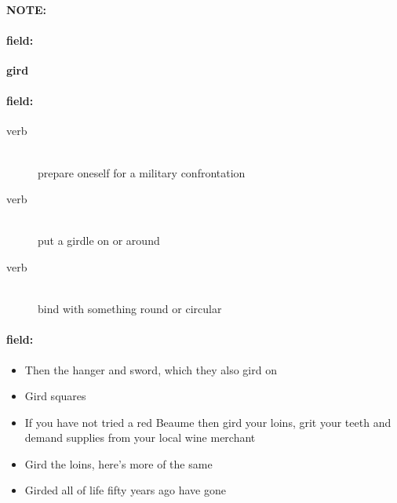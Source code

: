 \documentclass[12pt]{article}
\newenvironment{note}{\paragraph{NOTE:}}{}
\newenvironment{field}{\paragraph{field:}}{}
\begin{document}
\begin{note}
\begin{field}
\textbf{\large gird}
\end{field}


\begin{field}
\begin{description}
\item[verb] \hfill \\ 
prepare oneself for a military confrontation

\item[verb] \hfill \\ 
put a girdle on or around

\item[verb] \hfill \\ 
bind with something round or circular

\end{description}
\end{field}

\begin{field}
\begin{itemize}
\item Then the hanger and sword, which they also gird on
\item Gird squares
\item If you have not tried a red Beaume then gird your loins, grit your teeth and demand supplies from your local wine merchant
\item Gird the loins, here's more of the same
\item Girded all of life fifty years ago have gone
\end{itemize}
\end{field}
\end{note}
\end{document}
